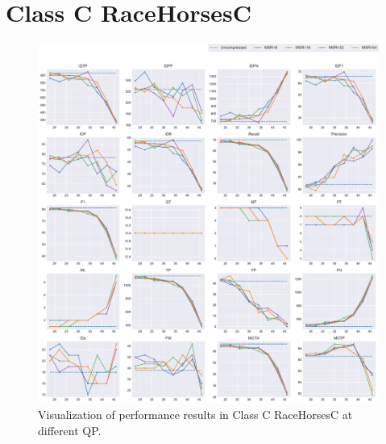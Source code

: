 
\section{Class C RaceHorsesC}
\label{sec:appendix/RaceHorsesC_all}


\begin{figure}[!htbp]
\centering
\includegraphics[width=1.0\linewidth]{img/appendix/RaceHorsesC_all_multiplots_qp.pdf}
\caption[Visualization of performance results in Class C RaceHorsesC at different QP]
{Visualization of performance results in Class C RaceHorsesC at different QP.}
\label{fig:RaceHorsesC_all_qp}
\end{figure}

